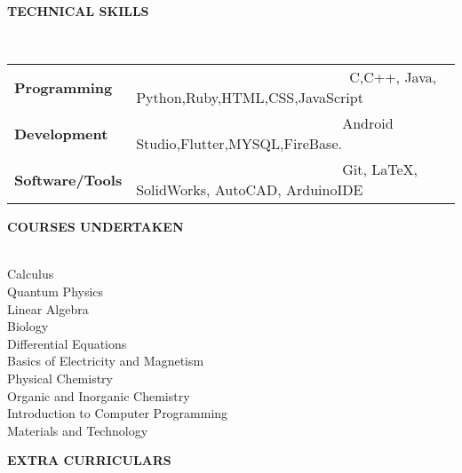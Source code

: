 \documentclass[letterpaper,11pt]{article}
\newcommand{\resheading}[1]{{\small \colorbox{mygrey}{\begin{minipage}{0.975\textwidth}{\textbf{#1 \vphantom{p\^{E}}}}\end{minipage}}}}
\newcommand{\lsep}{-0.5cm}
\begin{document}
 \resheading{\textbf{\large{TECHNICAL SKILLS}} }\\[\lsep]
 
\begin{tabular}{l l}
\\

\textbf{Programming} & \ \ \ \ \  \ \ \ \ \ \ \ \ \ \  \ \ \ \ \ \ \ \ \ \ \ \ \ \ \ C,C++, Java, Python,Ruby,HTML,CSS,JavaScript\\
\vspace{4pt}

\textbf{Development } & \ \ \ \ \  \ \ \ \ \ \ \ \ \ \  \ \ \ \ \ \ \ \ \ \ \ \ \ \  Android Studio,Flutter,MYSQL,FireBase.\\
\vspace{4pt}
\textbf{Software/Tools } & \ \ \ \ \  \ \ \ \ \ \ \ \ \ \  \ \ \ \ \ \ \ \ \ \ \  \ \ \  Git, \LaTeX{},  SolidWorks, AutoCAD, ArduinoIDE \vspace{4pt}\\
\end{tabular}

 \resheading{\textbf{\large{COURSES UNDERTAKEN}} }\\[\lsep]
 \vspace{20pt}
Calculus\\Quantum Physics\\Linear Algebra\\ Biology\\ Differential Equations\\Basics of Electricity and Magnetism\\Physical Chemistry\\ Organic and Inorganic Chemistry\\ Introduction to Computer Programming\\Materials and Technology

\vspace{10pt}

 \resheading{\textbf{\large{EXTRA CURRICULARS}} }\\[\lsep]
 
\end{document}
